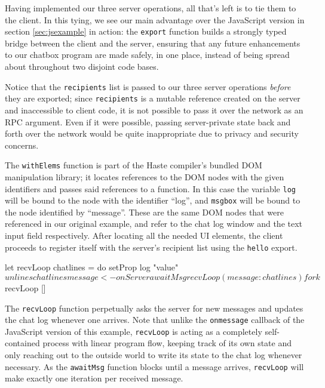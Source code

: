 \documentclass[preprint]{sigplanconf}
\begin{document}
Having implemented our three server operations, all that's left is to tie them
to the client. In this tying, we see our main advantage over the JavaScript
version in section \ref{sec:jsexample} in action: the \lstinline!export!
function builds a strongly typed bridge between the client and the server,
ensuring that any future enhancements to our chatbox program are made safely,
in one place, instead of being spread about throughout two disjoint code bases.

\begin{code}
clientMain :: App Done
clientMain = do
  recipients <- liftServerIO $ CC.newMVar []

  hello <- export $ srvHello recipients
  awaitMsg <- export $ srvAwait recipients
  sendMsg <- export $ srvSend recipients

  runClient $ do
    withElems ["log","message"] $ \[log,msgbox] -> do
      onServer hello
\end{code}

Notice that the \lstinline!recipients! list is passed to our three server
operations \emph{before} they are exported; since \lstinline!recipients! is
a mutable reference created on the server and inaccessible to client code,
it is not possible to pass it over the network as an RPC argument.
Even if it were possible, passing server-private state back and forth over the
network would be quite inappropriate due to privacy and security concerns.

The \lstinline!withElems! function is part of the Haste compiler's bundled DOM
manipulation library; it locates references to the DOM nodes with the given
identifiers and passes said references to a function.
In this case the variable \lstinline!log! will be bound to the node
with the identifier ``log'', and \lstinline!msgbox! will be bound to the node
identified by ``message''. These are the same DOM nodes that were referenced in
our original example, and refer to the chat log window and the text input
field respectively. After locating all the needed UI elements, the client
proceeds to register itself with the server's recipient list using the
\lstinline!hello! export.

\begin{code}
      let recvLoop chatlines = do
            setProp log "value" $ unlines chatlines
            message <- onServer awaitMsg
            recvLoop (message : chatlines)
      fork $ recvLoop []
\end{code}

The \lstinline!recvLoop! function perpetually asks the server for new messages
and updates the chat log whenever one arrives. Note that unlike the
\lstinline!onmessage! callback of the JavaScript version of this example,
\lstinline!recvLoop! is acting as a completely self-contained process with
linear program flow, keeping track of its own state and only reaching out to
the outside world to write its state to the chat log whenever necessary. As
the \lstinline!awaitMsg! function blocks until a message arrives,
\lstinline!recvLoop! will make exactly one iteration per received message.
\end{document}
